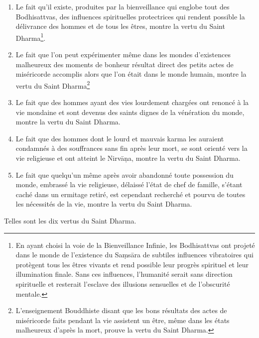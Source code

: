 \documentclass[10pt]{book}
\begin{document}
\begin{enumerate}[1.-]
\item Le fait qu'il existe, produites par la bienveillance qui englobe tout des Bodhisattvas, des influences spirituelles protectrices qui rendent possible la délivrance des hommes et de tous les êtres, montre la vertu du Saint Dharma\footnote{En ayant choisi la voie de la Bienveillance Infinie, les Bodhisattvas ont projeté dans le monde de l'existence du Saṃsāra de subtiles influences vibratoires qui protègent tous les êtres vivants et rend possible leur progrès spirituel et leur illumination finale. Sans ces influences, l'humanité serait sans direction spirituelle et resterait l'esclave des illusions sensuelles et de l'obscurité mentale.}.
\item Le fait que l'on peut expérimenter même dans les mondes d'existences malheureux des moments de bonheur résultat direct des petits actes de miséricorde accomplis alors que l'on était dans le monde humain, montre la vertu du Saint Dharma\footnote{L'enseignement Bouddhiste disant que les bons résultats des actes de miséricorde faits pendant la vie assistent un être, même dans les états malheureux d'après la mort, prouve la vertu du Saint Dharma.}
\item Le fait que des hommes ayant des vies lourdement chargées ont renoncé à la vie mondaine et sont devenus des saints dignes de la vénération du monde, montre la vertu du Saint Dharma.
\item Le fait que des hommes dont le lourd et mauvais karma les auraient condamnés à des souffrances sans fin après leur mort, se sont orienté vers la vie religieuse et ont atteint le Nirvāṇa, montre  la vertu du Saint Dharma.
\item Le fait que quelqu'un même après avoir abandonné toute possession du monde, embrassé la vie religieuse, délaissé l'état de chef de famille, s'étant caché dans un ermitage retiré, est cependant recherché et pourvu de toutes les nécessités de la vie, montre la vertu du Saint Dharma.
\end{enumerate}
Telles sont les dix vertus du Saint Dharma.
\end{document}
